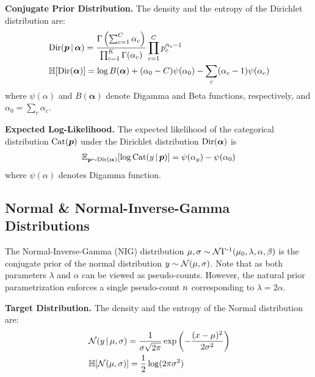 \textbf{Conjugate Prior Distribution.} The density and the entropy of the Dirichlet distribution are:
%
\begin{align}\label{eq:density-entropy-dirichlet}
        &\operatorname{Dir}(\bm{p} \,|\, \bm{\alpha}) = \frac{\Gamma\left(\sum_{c=1}^C{\alpha_c}\right)}{\prod_{c=1}^K{\Gamma(\alpha_c)}} \prod_{c=1}^C{p_c^{\alpha_c-1}}\\
        &\operatorname{\mathbb{H}}[\operatorname{Dir}(\bm{\alpha})] = \log B(\bm{\alpha}) + (\alpha_0 - C) \psi(\alpha_0) - \sum_c (\alpha_c - 1) \psi(\alpha_c)
\end{align}
%
where $\psi(\alpha)$ and $B(\bm{\alpha})$ denote Digamma and Beta functions, respectively, and $\alpha_0 = \sum_{c}{\alpha_c}$.

\textbf{Expected Log-Likelihood.} The expected likelihood of the categorical distribution $\operatorname{Cat}(\bm{p})$ under the Dirichlet distribution $\operatorname{Dir}(\bm{\alpha})$ is
%
\begin{align}\label{eq:expected-likelihood-cat-dir}
    \operatorname{\mathbb{E}}_{\bm{p} \sim \operatorname{Dir}(\bm{\alpha})}[\log \operatorname{Cat}(y \,|\, \bm{p})] = \psi(\alpha_{y}) - \psi(\alpha_0)
\end{align}
%
where $\psi(\alpha)$ denotes Digamma function.


\subsection{Normal \& Normal-Inverse-Gamma Distributions}

The Normal-Inverse-Gamma (NIG) distribution $\mu, \sigma \sim \operatorname{\mathcal{N}\Gamma^{-1}}(\mu_0, \lambda, \alpha, \beta)$ is the conjugate prior of the normal distribution $y \sim \operatorname{\mathcal{N}}(\mu, \sigma)$. Note that as both parameters $\lambda$ and $\alpha$ can be viewed as pseudo-counts. However, the natural prior parametrization enforces a single pseudo-count $n$ corresponding to $\lambda = 2 \alpha$.

\textbf{Target Distribution.} The density and the entropy of the Normal distribution are:
%
\begin{align}\label{eq:density-entropy-normal}
    &\operatorname{\mathcal{N}}(y \,|\, \mu, \sigma) = \frac{1}{\sigma \sqrt{2\pi}} \exp\left( -\frac{(x - \mu)^2}{2\sigma^2} \right)\\
    &\operatorname{\mathbb{H}}[\operatorname{\mathcal{N}}(\mu, \sigma)] = \frac{1}{2}\log(2\pi\sigma^2)
\end{align}

